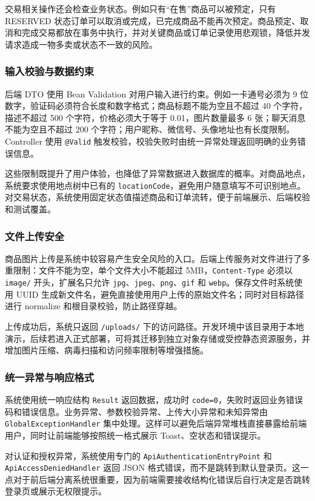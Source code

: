 ﻿\documentclass[UTF8,a4paper,12pt]{ctexart}
\begin{document}
交易相关操作还会检查业务状态。例如只有“在售”商品可以被预定，只有 RESERVED 状态订单可以取消或完成，已完成商品不能再次预定。商品预定、取消和完成交易都放在事务中执行，并对关键商品或订单记录使用悲观锁，降低并发请求造成一物多卖或状态不一致的风险。

\subsubsection{输入校验与数据约束}
后端 DTO 使用 Bean Validation 对用户输入进行约束。例如一卡通号必须为 9 位数字，验证码必须符合长度和数字格式；商品标题不能为空且不超过 40 个字符，描述不超过 500 个字符，价格必须大于等于 0.01，图片数量最多 6 张；聊天消息不能为空且不超过 200 个字符；用户昵称、微信号、头像地址也有长度限制。Controller 使用 \texttt{@Valid} 触发校验，校验失败时由统一异常处理返回明确的业务错误信息。

这些限制既提升了用户体验，也降低了异常数据进入数据库的概率。对商品地点，系统要求使用地点树中已有的 \texttt{locationCode}，避免用户随意填写不可识别地点。对交易状态，系统使用固定状态值描述商品和订单流转，便于前端展示、后端校验和测试覆盖。

\subsubsection{文件上传安全}
商品图片上传是系统中较容易产生安全风险的入口。后端上传服务对文件进行了多重限制：文件不能为空，单个文件大小不能超过 5MB，\texttt{Content-Type} 必须以 \texttt{image/} 开头，扩展名只允许 \texttt{jpg}、\texttt{jpeg}、\texttt{png}、\texttt{gif} 和 \texttt{webp}。保存文件时系统使用 UUID 生成新文件名，避免直接使用用户上传的原始文件名；同时对目标路径进行 normalize 和根目录校验，防止路径穿越。

上传成功后，系统只返回 \texttt{/uploads/} 下的访问路径。开发环境中该目录用于本地演示，后续若进入正式部署，可将其迁移到独立对象存储或受控静态资源服务，并增加图片压缩、病毒扫描和访问频率限制等增强措施。

\subsubsection{统一异常与响应格式}
系统使用统一响应结构 \texttt{Result} 返回数据，成功时 \texttt{code=0}，失败时返回业务错误码和错误信息。业务异常、参数校验异常、上传大小异常和未知异常由 \texttt{GlobalExceptionHandler} 集中处理。这样可以避免后端异常堆栈直接暴露给前端用户，同时让前端能够按照统一格式展示 Toast、空状态和错误提示。

对认证和授权异常，系统使用专门的 \texttt{ApiAuthenticationEntryPoint} 和 \texttt{ApiAccessDeniedHandler} 返回 JSON 格式错误，而不是跳转到默认登录页。这一点对于前后端分离系统很重要，因为前端需要接收结构化错误后自行决定是否跳转登录页或展示无权限提示。
\end{document}
